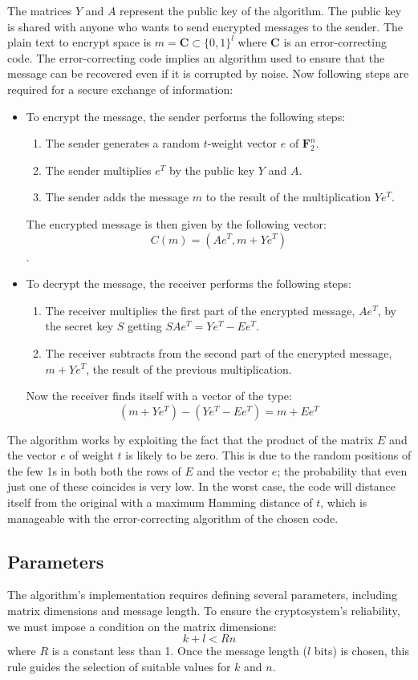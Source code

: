 The matrices $Y$ and $A$ represent the public key of the algorithm. The public key is shared with anyone who wants to send encrypted messages to the sender.
The plain text to encrypt space is $m = \mathbf{C} \subset \{0,1\}^l $ where $\mathbf{C}$ is an error-correcting code. The error-correcting code implies an algorithm used to ensure that the message can be recovered even if it is corrupted by noise.
Now following steps are required for a secure exchange of information:
\begin{itemize}
 \item To encrypt the message, the sender performs the following steps:
    \begin{enumerate}
     \item The sender generates a random $t$-weight vector $e$ of $\mathbf{F}_2^n $.
     \item The sender multiplies $e^T$ by the public key $Y$ and $A$.
     \item The sender adds the message $m$ to the result of the multiplication $Ye^T$.
    \end{enumerate}
    The encrypted message is then given by the following vector: $$C(m) = (Ae^T, m+Ye^T)$$.
    \item To decrypt the message, the receiver performs the following steps:
    \begin{enumerate}
     \item The receiver multiplies the first part of the encrypted message, $Ae^T$, by the secret key $S$ getting $SAe^T = Ye^T-Ee^T $.
     \item The receiver subtracts from the second part of the encrypted message, $m+Ye^T$, the result of the previous multiplication.
    \end{enumerate}
    Now the receiver finds itself with a vector of the type: $$(m+Ye^T) - (Ye^T-Ee^T) = m + Ee^T$$
\end{itemize}
The algorithm works by exploiting the fact that the product of the matrix $E$ and the vector $e$ of weight $t$ is likely to be zero. This is due to the random positions of the few 1s in both both the rows of $E$ and the vector $e$; the probability that even just one of these coincides is very low.
In the worst case, the code will distance itself from the original with a maximum Hamming distance of $t$, which is manageable with the error-correcting algorithm of the chosen code.

\subsection{Parameters}
The algorithm's implementation requires defining several parameters, including matrix dimensions and message length. To ensure the cryptosystem's reliability, we must impose a condition on the matrix dimensions: $$k + l < Rn$$ where $R$ is a constant less than 1. Once the message length ($l$ bits) is chosen, this rule guides the selection of suitable values for $k$ and $n$.

